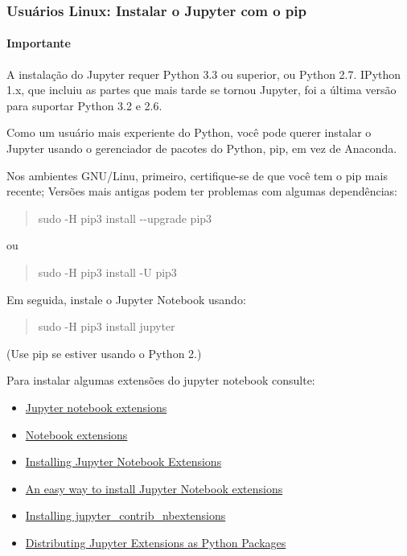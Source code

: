 \documentclass[11pt]{article}
\providecommand{\tightlist}{%
      \setlength{\itemsep}{0pt}\setlength{\parskip}{0pt}}
\begin{document}
\subsubsection{Usuários Linux: Instalar o Jupyter com o pip
}\label{usuuxe1rios-linux-instalar-o-jupyter-com-o-pip}

\paragraph{Importante}\label{importante}

A instalação do Jupyter requer Python 3.3 ou superior, ou Python 2.7.
IPython 1.x, que incluiu as partes que mais tarde se tornou Jupyter, foi
a última versão para suportar Python 3.2 e 2.6.

Como um usuário mais experiente do Python, você pode querer instalar o
Jupyter usando o gerenciador de pacotes do Python, pip, em vez de
Anaconda.

Nos ambientes GNU/Linu, primeiro, certifique-se de que você tem o pip
mais recente; Versões mais antigas podem ter problemas com algumas
dependências:

\begin{quote}
sudo -H pip3 install -\/-upgrade pip3
\end{quote}

ou

\begin{quote}
sudo -H pip3 install -U pip3
\end{quote}

Em seguida, instale o Jupyter Notebook usando:

\begin{quote}
sudo -H pip3 install jupyter
\end{quote}

(Use pip se estiver usando o Python 2.)

Para instalar algumas extensões do jupyter notebook consulte:

\begin{itemize}
\tightlist
\item
  \href{https://github.com/ipython-contrib/jupyter_contrib_nbextensions}{Jupyter
  notebook extensions}
\item
  \href{https://carreau.gitbooks.io/jupyter-book/content/notebook-extensions.html}{Notebook
  extensions}
\item
  \href{https://www.oreilly.com/learning/installing-jupyter-notebook-extensions}{Installing
  Jupyter Notebook Extensions}
\item
  \href{http://blog.rtwilson.com/an-easy-way-to-install-jupyter-notebook-extensions/}{An
  easy way to install Jupyter Notebook extensions}
\item
  \href{http://jupyter-contrib-nbextensions.readthedocs.io/en/latest/install.html}{Installing
  jupyter\_contrib\_nbextensions}
\item
  \href{http://jupyter-notebook.readthedocs.io/en/latest/examples/Notebook/Distributing\%20Jupyter\%20Extensions\%20as\%20Python\%20Packages.html}{Distributing
  Jupyter Extensions as Python Packages}
\end{itemize}
\end{document}
